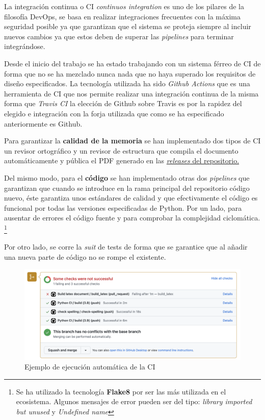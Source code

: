 La integración continua o CI \textit{continuos integration} es uno de los pilares de la
filosofía DevOps, se basa en realizar integraciones frecuentes con la máxima seguridad
posible ya que garantizan que el sistema se proteja siempre al incluir nuevos cambios ya
que estos deben de superar las \textit{pipelines} para terminar integrándose. 

Desde el inicio del trabajo se ha estado trabajando con un sistema férreo de CI de forma
que no se ha mezclado nunca nada que no haya superado los requisitos de diseño
especificados. La tecnología utilizada ha sido \textit{Github Actions} que es
una herramienta de CI que nos permite realizar una integración continua de la misma forma
que \textit{Travis CI} la elección de Github sobre Travis es por la rapidez del elegido e
integración con la forja utilizada que como se ha especificado anteriormente es Github.

Para garantizar la \textbf{calidad de la memoria} se han implementado dos tipos de CI\: un
revisor ortográfico y un revisor de estructura que compila el documento automáticamente y
pública el PDF generado en las
\href{https://github.com/pablojjimenez/TFG/releases}{\textit{releases} del repositorio.}

Del mismo modo, para el \textbf{código} se han implementado otras dos \textit{pipelines} que garantizan
que cuando se introduce en la rama principal del repositorio código nuevo, éste garantiza
unos estándares de calidad y que efectivamente el código es funcional por todas las
versiones especificadas de Python. Por un lado, para ausentar de errores el código fuente
y para comprobar la complejidad ciclomática. \footnote{Se ha utilizado la tecnología
\textbf{Flake8} por ser las más utilizada en el ecosistema. Algunos mensajes de error
pueden ser del tipo: \textit{library imported but unused} y \textit{Undefined name} } 

Por otro lado, se corre la \textit{suit} de tests de forma que se garantice que al añadir
una nueva parte de código no se rompe el existente. 

\FloatBarrier
\begin{figure}[h]
	\centering	
	\includegraphics[width=\textwidth]{doc/logos/imgs/CI-pr.png}
    \caption{Ejemplo de ejecución automática de la CI}
    \label{fig:tipos-de-cc}
\end{figure}
\FloatBarrier


